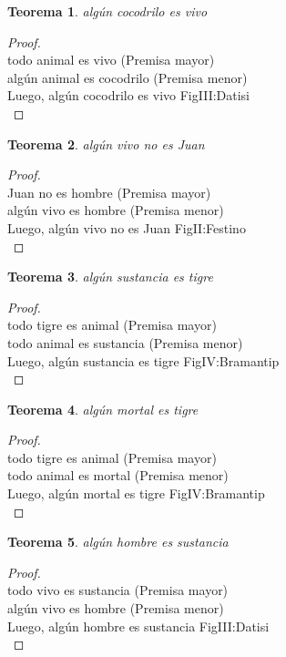 ﻿\documentclass[12pt]{book}
\newtheorem{theorem}{Teorema}[chapter]
\newtheorem{proof}{Demostración}
\begin{document}
\begin{theorem}
algún cocodrilo es vivo
\label{th: 46}
\end{theorem}\begin{proof}\\todo animal es vivo	 (Premisa mayor) \\algún animal es cocodrilo	 (Premisa menor) \\Luego, algún cocodrilo es vivo	FigIII:Datisi \\ \end{proof}
\begin{theorem}
algún vivo no es Juan
\label{th: 47}
\end{theorem}\begin{proof}\\Juan no es hombre	 (Premisa mayor) \\algún vivo es hombre	 (Premisa menor) \\Luego, algún vivo no es Juan	FigII:Festino \\ \end{proof}
\begin{theorem}
algún sustancia es tigre
\label{th: 48}
\end{theorem}\begin{proof}\\todo tigre es animal	 (Premisa mayor) \\todo animal es sustancia	 (Premisa menor) \\Luego, algún sustancia es tigre	FigIV:Bramantip \\ \end{proof}
\begin{theorem}
algún mortal es tigre
\label{th: 49}
\end{theorem}\begin{proof}\\todo tigre es animal	 (Premisa mayor) \\todo animal es mortal	 (Premisa menor) \\Luego, algún mortal es tigre	FigIV:Bramantip \\ \end{proof}
\begin{theorem}
algún hombre es sustancia
\label{th: 50}
\end{theorem}\begin{proof}\\todo vivo es sustancia	 (Premisa mayor) \\algún vivo es hombre	 (Premisa menor) \\Luego, algún hombre es sustancia	FigIII:Datisi \\ \end{proof}
\end{document}
